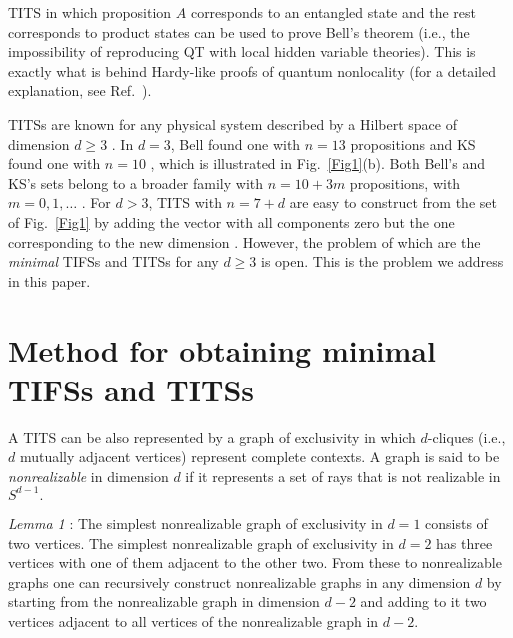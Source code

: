 \documentclass[%
 twocolumn,
 groupedaddress,
 showpacs,
 showkeys,
 preprintnumbers,
 amsmath,amssymb,
 aps,
 pra,
 longbibliography,
 floatfix,
 ]{revtex4-1}
\begin{document}
TITS in which proposition $A$ corresponds to an entangled state and the rest corresponds to product states can be used to prove Bell's theorem (i.e., the impossibility of reproducing QT with local hidden variable theories). This is exactly what is behind Hardy-like proofs of quantum nonlocality \cite{Hardy93} (for a detailed explanation, see Ref.~\cite{CEG96}).

TITSs are known for any physical system described by a Hilbert space of dimension $d \ge 3$ \cite{KS65, Bell66}. In $d=3$, Bell found one with $n= 13$ propositions \cite{Bell66} and KS found one with $n=10$ \cite{KS67}, which is illustrated in Fig.~\ref{Fig1}(b). Both Bell's and KS's sets belong to a broader family with $n=10+3m$ propositions, with $m=0,1,\ldots$ \cite{CG95}. For $d>3$, TITS with $n=7+d$ are easy to construct from the set of Fig.~\ref{Fig1} by adding the vector with all components zero but the one corresponding to the new dimension \cite{CG95}. However, the problem of which are the {\em minimal} TIFSs and TITSs for any $d \ge 3$ is open. This is the problem we address in this paper.


\section{Method for obtaining minimal TIFSs and TITSs}


A TITS can be also represented by a graph of exclusivity in which $d$-cliques (i.e., $d$ mutually adjacent vertices) represent complete contexts. A graph is said to be \emph{nonrealizable} in dimension $d$ if it represents a set of rays that is not realizable in $S^{d-1}.$


{\em Lemma 1} \cite{CDLP13}: The simplest nonrealizable graph of exclusivity in $d=1$ consists of two vertices. The simplest nonrealizable graph of exclusivity in $d=2$ has three vertices with one of them adjacent to the other two. From these to nonrealizable graphs one can recursively construct nonrealizable graphs in any dimension $d$ by starting from the nonrealizable graph in dimension $d-2$ and adding to it two vertices adjacent to all vertices of the nonrealizable graph in $d-2$.
\end{document}

